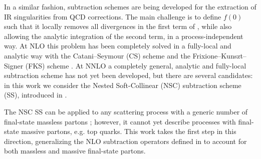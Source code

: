 In a similar fashion, subtraction schemes are being developed for the extraction of IR singularities from QCD corrections. The main challenge is to define $ f(0) $ such that it locally removes all divergences in the first term of , while also allowing the analytic integration of the second term, in a process-independent way. At NLO this problem has been completely solved in a fully-local and analytic way with the Catani--Seymour (CS) scheme \cite{Catani-1997} and the Frixione--Kunszt--Signer (FKS) scheme \cite{Frixione-1996, Frixione-1997}. At NNLO a completely general, analytic and fully-local subtraction scheme has not yet been developed, but there are several candidates: in this work we consider the Nested Soft-Collinear (NSC) subtraction scheme (SS), introduced in \cite{rontsch-2017}.

The NSC SS can be applied to any scattering process with a generic number of final-state massless partons \cite{rontsch-2509}; however, it cannot yet describe processes with final-state massive partons, e.g. top quarks. This work takes the first step in this direction, generalizing the NLO subtraction operators defined in \cite{rontsch-2023, rontsch-2503, rontsch-2509} to account for both massless and massive final-state partons.












